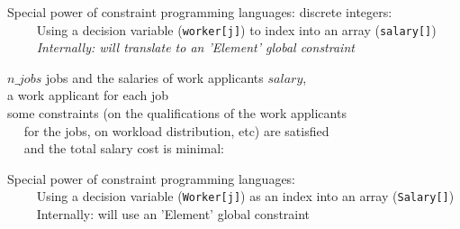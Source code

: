\documentclass{cons-beamer}
\begin{document}
{\begin{flashcardcpmpy}
\begin{frame}
\begin{example}
    
    \vspace{-3mm}
  \end{example} \vfill

  \textcolor{Melon}{Special power} of constraint programming languages: discrete integers: \\
  ~~~~ Using a decision variable (\texttt{worker[j]}) to index into an array (\texttt{salary[]}) \\
  ~~~~ \textit{Internally: will translate to an 'Element' global constraint}
\end{frame}
\end{flashcardcpmpy}
\begin{flashcardminizinc}
\begin{frame}[fragile]
  \begin{example}
     $n\_jobs$ jobs and the salaries of work applicants $salary$, \\ 
     a work applicant for each job \\ 
     some constraints (on the qualifications of the work applicants \\
    ~~ for the jobs, on workload distribution, etc) are satisfied \\ 
    ~~ and the total salary cost is minimal: 

    \footnotesize
    
  \end{example} \vfill

  \textcolor{Melon}{Special power} of constraint programming languages: \\
  ~~~~ Using a decision variable (\texttt{Worker[j]}) as an index into an array (\texttt{Salary[]}) \\
  ~~~~ Internally: will use an 'Element' global constraint
\end{frame}
\end{flashcardminizinc}
}
\end{document}
